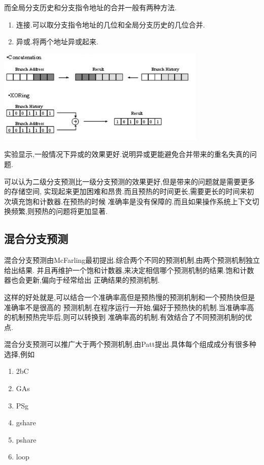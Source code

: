 \documentclass[adobefonts, nocap]{ctexart}
\begin{document}
      而全局分支历史和分支指令地址的合并一般有两种方法.

      \begin{enumerate}
        \item 连接.可以取分支指令地址的几位和全局分支历史的几位合并.
        \item 异或.将两个地址异或起来.
      \end{enumerate}

      \begin{center}
        \includegraphics[width=10cm]{3.png}
      \end{center}

      实验显示,一般情况下异或的效果更好.说明异或更能避免合并带来的重名失真的问题.

      可以认为二级分支预测比一级分支预测的效果更好,但是带来的问题就是需要更多的存储空间,
      实现起来更加困难和昂贵.而且预热的时间更长,需要更长的时间来初次填充饱和计数器.在预热的时候
      准确率是没有保障的.而且如果操作系统上下文切换频繁,则预热的问题将更加显著.
    \subsection{混合分支预测}
      混合分支预测由McFarling最初提出.综合两个不同的预测机制,由两个预测机制独立给出结果.
      并且再维护一个饱和计数器,来决定相信哪个预测机制的结果.饱和计数器也会更新,偏向于经常给出
      正确结果的预测机制.

      这样的好处就是,可以结合一个准确率高但是预热慢的预测机制和一个预热快但是准确率不是很高的
      预测机制.在程序运行一开始,偏好于预热快的机制.当准确率高的机制预热完毕后,则可以转换到
      准确率高的机制.有效结合了不同预测机制的优点.

      混合分支预测可以推广大于两个预测机制,由Patt提出.具体每个组成成分有很多种选择,例如

      \begin{enumerate}
        \item 2bC
        \item GAs
        \item PSg
        \item gshare
        \item pshare
        \item loop
      \end{enumerate}
\end{document}
